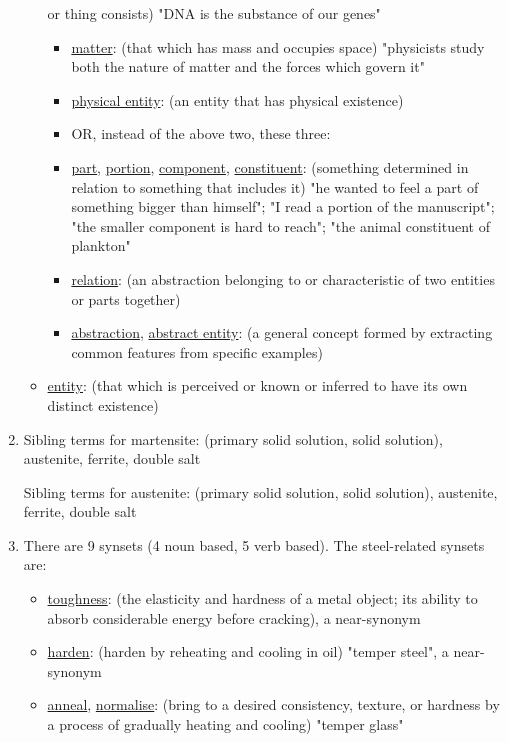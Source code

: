\documentclass[12pt]{report}
\begin{document}
\begin{enumerate}
\begin{itemize}
    or thing consists)
    "DNA is the substance of our genes"
    \begin{itemize}
      \item \underline{matter}: (that which has mass and occupies space)
      "physicists study both the nature of matter and the forces which govern
      it"
      \item \underline{physical entity}: (an entity that has physical
      existence)
      \item OR, instead of the above two, these three:
      \item \underline{part}, \underline{portion}, \underline{component},
      \underline{constituent}: (something determined in relation to something
      that includes it)
      "he wanted to feel a part of something bigger than himself"; "I read a
      portion of the manuscript"; "the smaller component is hard to reach";
      "the animal constituent of plankton"
      \item \underline{relation}: (an abstraction belonging to or
      characteristic of two entities or parts together)
      \item \underline{abstraction}, \underline{abstract entity}: (a general
      concept formed by extracting common features from specific examples)
    \end{itemize}
    \item \underline{entity}: (that which is perceived or known or inferred
    to have its own distinct existence)
  \end{itemize}
  \item Sibling terms for martensite: (primary solid solution, solid solution),
  austenite, ferrite, double salt\par
  Sibling terms for austenite: (primary solid solution, solid solution),
  austenite, ferrite, double salt
  \item There are 9 synsets (4 noun based, 5 verb based). The steel-related
  synsets are:
  \begin{itemize}
    \item \underline{toughness}: (the elasticity and hardness of a metal
    object; its ability to absorb considerable energy before cracking), a
    near-synonym
    \item \underline{harden}: (harden by reheating and cooling in oil)
    "temper steel", a near-synonym
    \item \underline{anneal}, \underline{normalise}: (bring to a desired
    consistency, texture, or hardness by a process of gradually heating and
    cooling) "temper glass"
  \end{itemize}
\end{enumerate}
\end{document}
